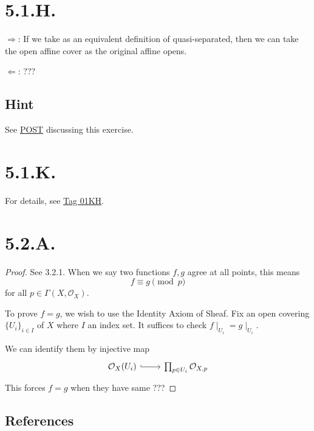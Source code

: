 \section{5.1.H.}\label{5.1.H.}

$\Rightarrow$: If we take  as an equivalent definition of quasi-separated, then we can take the open affine cover as the original affine opens. 

$\Leftarrow$: ??? 

\subsection{Hint}

See \href{https://math.stackexchange.com/questions/4625360/scheme-quasiseparated-iff-covered-by-affine-open-subsets-any-two-of-which-have}{POST} discussing this exercise. 

\section{5.1.K.}

For details, see \href{https://stacks.math.columbia.edu/tag/01KH}{Tag 01KH}.

\section{5.2.A.}

\begin{proof}
    
See 3.2.1. When we say two functions $f,g$ agree at all points, this means 
\[f\equiv g\pmod{p}\] for all $p\in \Gamma(X,\mathcal O_X)$.    

To prove $f=g$, we wish to use the Identity Axiom of Sheaf. Fix an open covering $\{U_i\}_{i\in I}$ of $X$ where $I$ an index set. It suffices to check $f\mid_{U_i}=g\mid_{U_i}$.

We can identify them by injective map 
\[\begin{tikzcd}
	{\mathcal O_X(U_i)} & {\prod_{p\in U_i}\mathcal O_{X,p}}
	\arrow[hook, from=1-1, to=1-2]
\end{tikzcd}\]
This forces $f=g$ when they have same ???

\end{proof}

\subsection{References}

